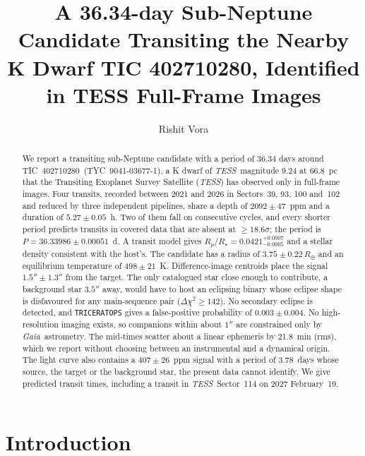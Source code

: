\documentclass[twocolumn]{aastex631}
\newcommand{\tic}{TIC~402710280}
\newcommand{\tess}{\textit{TESS}}
\newcommand{\gaia}{\textit{Gaia}}
\newcommand{\rearth}{R_\oplus}
\begin{document}
\title{A 36.34-day Sub-Neptune Candidate Transiting the Nearby K Dwarf TIC 402710280, Identified in TESS Full-Frame Images}

\author[0000-0000-0000-0000]{Rishit Vora}

\begin{abstract}
We report a transiting sub-Neptune candidate with a period of 36.34 days around \tic\ (TYC~9041-03677-1), a K dwarf of \tess\ magnitude 9.24 at 66.8~pc that the Transiting Exoplanet Survey Satellite (\tess) has observed only in full-frame images. Four transits, recorded between 2021 and 2026 in Sectors~39, 93, 100 and~102 and reduced by three independent pipelines, share a depth of $2092 \pm 47$~ppm and a duration of $5.27 \pm 0.05$~h. Two of them fall on consecutive cycles, and every shorter period predicts transits in covered data that are absent at $\geq 18.6\sigma$; the period is $P = 36.33986 \pm 0.00051$~d. A transit model gives $R_p/R_\star = 0.0421^{+0.0007}_{-0.0005}$ and a stellar density consistent with the host's. The candidate has a radius of $3.75 \pm 0.22\,\rearth$ and an equilibrium temperature of $498 \pm 21$~K. Difference-image centroids place the signal $1.5'' \pm 1.3''$ from the target. The only catalogued star close enough to contribute, a background star $3.5''$ away, would have to host an eclipsing binary whose eclipse shape is disfavoured for any main-sequence pair ($\Delta\chi^2 \geq 142$). No secondary eclipse is detected, and \texttt{TRICERATOPS} gives a false-positive probability of $0.003 \pm 0.004$. No high-resolution imaging exists, so companions within about $1''$ are constrained only by \gaia\ astrometry. The mid-times scatter about a linear ephemeris by 21.8~min (rms), which we report without choosing between an instrumental and a dynamical origin. The light curve also contains a $407 \pm 26$~ppm signal with a period of 3.78~days whose source, the target or the background star, the present data cannot identify. We give predicted transit times, including a transit in \tess\ Sector~114 on 2027 February~19.
\end{abstract}


\section{Introduction} \label{sec:intro}
\end{document}
